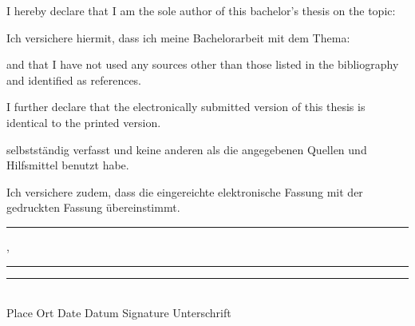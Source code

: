 \vfill
\begin{paracol}{2}
    \begin{leftcolumn}
        I hereby declare that I am the sole author of this bachelor's thesis on the topic:
    \end{leftcolumn}
    
    \begin{rightcolumn}
        \color{gray}
        Ich versichere hiermit, dass ich meine Bachelorarbeit mit dem Thema:
    \end{rightcolumn}
\end{paracol}

\begin{center}
    \vspace{1cm}
    \textit{\@title}
    \vspace{1cm}
\end{center}

\begin{paracol}{2}
    \begin{leftcolumn}
        and that I have not used any sources other than those listed in the bibliography and identified as references. 
        
        I further declare that the electronically submitted version of this thesis is identical to the printed version.
    \end{leftcolumn}
    
    \begin{rightcolumn}
        \color{gray}
        selbstst\"andig verfasst und keine anderen als die angegebenen Quellen und Hilfsmittel benutzt habe. 
        
        Ich versichere zudem, dass die eingereichte elektronische Fassung mit der gedruckten Fassung \"ubereinstimmt.
    \end{rightcolumn}
    
\end{paracol}

\vfill

\rule{3,5cm}{0.4pt}, \rule{3,5cm}{0.4pt} \hspace{0.38cm} \rule{7cm}{0.4pt}\\
Place {\color{gray}Ort}
\hspace{1.8cm}
Date {\color{gray}Datum}
\hspace{1.6cm}
Signature {\color{gray}Unterschrift}



\vfill